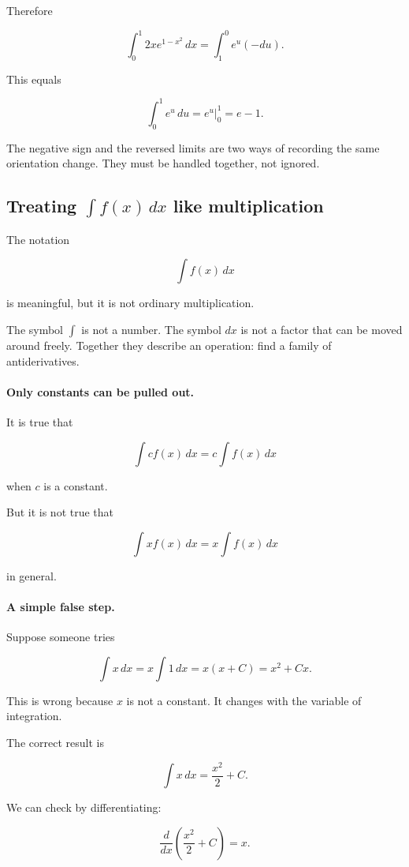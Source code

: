 Therefore

\[
\int_0^1 2x e^{1-x^2}\,dx
=
\int_1^0 e^u(-du).
\]

This equals

\[
\int_0^1 e^u\,du
=
e^u\Big|_0^1
=
\boxed{e-1}.
\]

The negative sign and the reversed limits are two ways of recording the same
orientation change.  They must be handled together, not ignored.

\subsection{Treating \texorpdfstring{\(\int f(x)\,dx\)}{int f(x) dx} like multiplication}
\label{subsec:warning-integral-like-multiplication}

The notation

\[
\int f(x)\,dx
\]

is meaningful, but it is not ordinary multiplication.

The symbol \(\int\) is not a number.  The symbol \(dx\) is not a factor that can be
moved around freely.  Together they describe an operation: find a family of
antiderivatives.

\paragraph{Only constants can be pulled out.}
It is true that

\[
\int c f(x)\,dx=c\int f(x)\,dx
\]

when \(c\) is a constant.

But it is not true that

\[
\int x f(x)\,dx=x\int f(x)\,dx
\]

in general.

\paragraph{A simple false step.}
Suppose someone tries

\[
\int x\,dx
=
x\int 1\,dx
=
x(x+C)
=
x^2+Cx.
\]

This is wrong because \(x\) is not a constant.  It changes with the variable of
integration.

The correct result is

\[
\int x\,dx=\frac{x^2}{2}+C.
\]

We can check by differentiating:

\[
\frac{d}{dx}\left(\frac{x^2}{2}+C\right)=x.
\]

